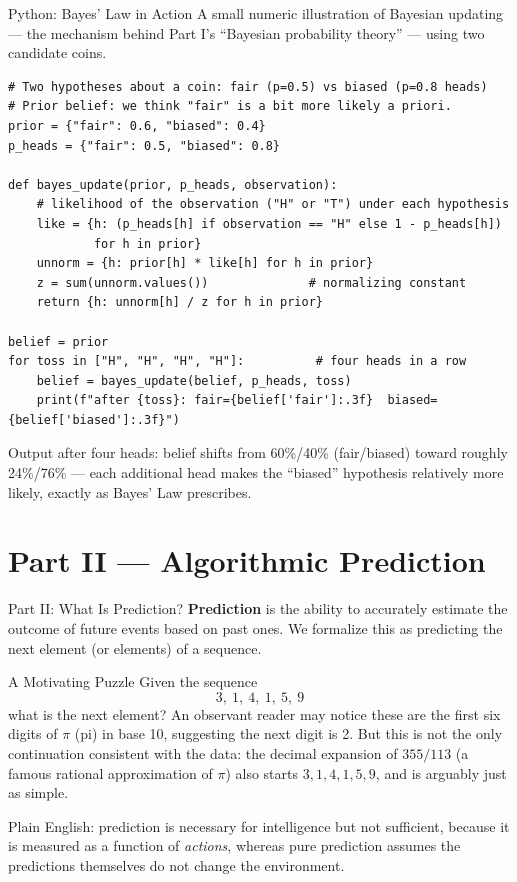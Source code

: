 \documentclass[aspectratio=169,10pt]{beamer}
\begin{document}
\begin{frame}[fragile]{Python: Bayes' Law in Action}
  A small numeric illustration of Bayesian updating --- the mechanism behind
  Part I's ``Bayesian probability theory'' --- using two candidate coins.

  \begin{lstlisting}[style=pycode]
# Two hypotheses about a coin: fair (p=0.5) vs biased (p=0.8 heads)
# Prior belief: we think "fair" is a bit more likely a priori.
prior = {"fair": 0.6, "biased": 0.4}
p_heads = {"fair": 0.5, "biased": 0.8}

def bayes_update(prior, p_heads, observation):
    # likelihood of the observation ("H" or "T") under each hypothesis
    like = {h: (p_heads[h] if observation == "H" else 1 - p_heads[h])
            for h in prior}
    unnorm = {h: prior[h] * like[h] for h in prior}
    z = sum(unnorm.values())              # normalizing constant
    return {h: unnorm[h] / z for h in prior}

belief = prior
for toss in ["H", "H", "H", "H"]:          # four heads in a row
    belief = bayes_update(belief, p_heads, toss)
    print(f"after {toss}: fair={belief['fair']:.3f}  biased={belief['biased']:.3f}")
  \end{lstlisting}
  Output after four heads: belief shifts from 60\%/40\% (fair/biased) toward
  roughly 24\%/76\% --- each additional head makes the ``biased'' hypothesis
  relatively more likely, exactly as Bayes' Law prescribes.
\end{frame}

\section{Part II --- Algorithmic Prediction}

\begin{frame}{Part II: What Is Prediction?}
  \textbf{Prediction} is the ability to accurately estimate the outcome of
  future events based on past ones. We formalize this as predicting the next
  element (or elements) of a sequence.

  \begin{block}{A Motivating Puzzle}
    Given the sequence
    \[
      3,\ 1,\ 4,\ 1,\ 5,\ 9
    \]
    what is the next element? An observant reader may notice these are the
    first six digits of $\pi$ (pi) in base 10, suggesting the next digit is
    2. But this is not the only continuation consistent with the data: the
    decimal expansion of $355/113$ (a famous rational approximation of $\pi$)
    also starts $3,1,4,1,5,9$, and is arguably just as simple.
  \end{block}
  Plain English: prediction is necessary for intelligence but not
  sufficient, because it is measured as a function of \emph{actions}, whereas
  pure prediction assumes the predictions themselves do not change the
  environment.
\end{frame}
\end{document}
